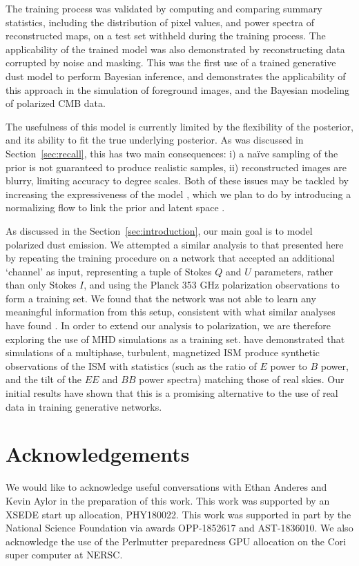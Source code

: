 \documentclass[fleqn,usenatbib]{mnras}
\begin{document}
The training process was validated by computing and comparing summary statistics, including the distribution of pixel values, and power spectra of reconstructed maps, on a test set withheld during the training process. The applicability of the trained model was also demonstrated by reconstructing data corrupted by noise and masking. This was the first use of a trained generative dust model to perform Bayesian inference, and demonstrates the applicability of this approach in the simulation of foreground images, and the Bayesian modeling of polarized CMB data. 

The usefulness of this model is currently limited by the flexibility of the posterior, and its ability to fit the true underlying posterior. As was discussed in Section~\ref{sec:recall}, this has two main consequences: i) a na\"ive sampling of the prior is not guaranteed to produce realistic samples, ii) reconstructed images are blurry, limiting accuracy to degree scales. Both of these issues may be tackled by increasing the expressiveness of the model \citep{kingma/welling:2019}, which we plan to do by introducing a normalizing flow to link the prior and latent space \citep{kingma/etal:2016}.

As discussed in the Section~\ref{sec:introduction}, our main goal is to model polarized dust emission. We attempted a similar analysis to that presented here by repeating the training procedure on a network that accepted an additional `channel' as input, representing a tuple of Stokes $Q$ and $U$ parameters, rather than only Stokes $I$, and using the Planck 353 GHz polarization observations to form a training set. We found that the network was not able to learn any meaningful information from this setup, consistent with what similar analyses have found \citep{petroff/etal:2020}. In order to extend our analysis to polarization, we are therefore exploring the use of MHD simulations \citep{kim/etal:2019} as a training set. \cite{kim/etal:2019} have demonstrated that simulations of a multiphase, turbulent, magnetized ISM produce synthetic observations of the ISM with statistics (such as the ratio of $E$ power to $B$ power, and the tilt of the $EE$ and $BB$ power spectra) matching those of real skies. Our initial results have shown that this is a promising alternative to the use of real data in training generative networks.

\section*{Acknowledgements}
We would like to acknowledge useful conversations with Ethan Anderes and Kevin Aylor in the preparation of this work. This work was supported by an XSEDE start up allocation, PHY180022. This work was supported in part by the National Science Foundation via awards OPP-1852617 and AST-1836010. 
We also acknowledge the use of the Perlmutter preparedness GPU allocation on the Cori super computer at NERSC.
\end{document}

